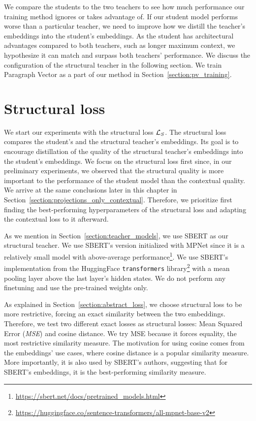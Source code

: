 We compare the students to the two teachers to see how much performance our
training method ignores or takes advantage of. If our student model performs
worse than a particular teacher, we need to improve how we distill the
teacher's embeddings into the student's embeddings. As the student has
architectural advantages compared to both teachers, such as longer maximum
context, we hypothesize it can match and surpass both teachers' performance. We
discuss the configuration of the structural teacher in the following section.
We train Paragraph Vector as a part of our method in
Section~\ref{section:pv_training}.

\section{Structural loss}\label{section:structural_loss}

We start our experiments with the structural loss $\mathcal{L}_S$. The structural
loss compares the student's and the structural teacher's embeddings. Its goal
is to encourage distillation of the quality of the structural teacher's
embeddings into the student's embeddings. We focus on the structural loss first
since, in our preliminary experiments, we observed that the structural quality
is more important to the performance of the student model than the contextual
quality. We arrive at the same conclusions later in this chapter in
Section~\ref{section:projections_only_contextual}. Therefore, we prioritize
first finding the best-performing hyperparameters of the structural loss and
adapting the contextual loss to it afterward.

As we mention in Section~\ref{section:teacher_models}, we use SBERT
\citep{reimers2019sentence} as our structural teacher. We use SBERT's version
initialized with MPNet \citep{song2020mpnet} since it is a relatively small
model with above-average
performance\footnote{\url{https://sbert.net/docs/pretrained_models.html}}. We
use SBERT's implementation from the HuggingFace \texttt{transformers}
library\footnote{\url{https://huggingface.co/sentence-transformers/all-mpnet-base-v2}}
with a mean pooling layer above the last layer's hidden states. We do not
perform any finetuning and use the pre-trained weights only.

As explained in Section~\ref{section:abstract_loss}, we choose structural loss
to be more restrictive, forcing an exact similarity between the two embeddings.
Therefore, we test two different exact losses as structural losses: Mean Squared
Error (\emph{MSE}) and cosine distance. We try MSE because it forces
equality, the most restrictive similarity measure. The motivation for using
cosine comes from the embeddings' use cases, where cosine distance is a popular
similarity measure. More importantly, it is also used by SBERT's authors,
suggesting that for SBERT's embeddings, it is the best-performing similarity
measure.

